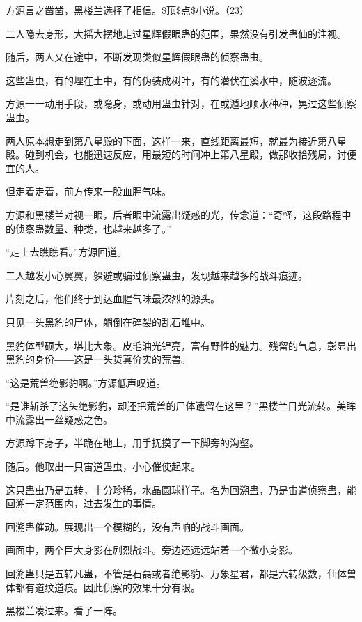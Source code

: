 
\begin{this_body}

方源言之凿凿，黑楼兰选择了相信。\$顶\$点\$小说。（23）

二人隐去身形，大摇大摆地走过星辉假眼蛊的范围，果然没有引发蛊仙的注视。

随后，两人又在途中，不断发现类似星辉假眼蛊的侦察蛊虫。

这些蛊虫，有的埋在土中，有的伪装成树叶，有的潜伏在溪水中，随波逐流。

方源一一动用手段，或隐身，或动用蛊虫针对，在或遁地顺水种种，晃过这些侦察蛊虫。

两人原本想走到第八星殿的下面，这样一来，直线距离最短，就最为接近第八星殿。碰到机会，也能迅速反应，用最短的时间冲上第八星殿，做那收拾残局，讨便宜的人。

但走着走着，前方传来一股血腥气味。

方源和黑楼兰对视一眼，后者眼中流露出疑惑的光，传念道：“奇怪，这段路程中的侦察蛊数量、种类，也越来越多了。”

“走上去瞧瞧看。”方源回道。

二人越发小心翼翼，躲避或骗过侦察蛊虫，发现越来越多的战斗痕迹。

片刻之后，他们终于到达血腥气味最浓烈的源头。

只见一头黑豹的尸体，躺倒在碎裂的乱石堆中。

黑豹体型硕大，堪比大象。皮毛油光锃亮，富有野性的魅力。残留的气息，彰显出黑豹的身份――这是一头货真价实的荒兽。

“这是荒兽绝影豹啊。”方源低声叹道。

“是谁斩杀了这头绝影豹，却还把荒兽的尸体遗留在这里？”黑楼兰目光流转。美眸中流露出一丝疑惑之色。

方源蹲下身子，半跪在地上，用手抚摸了一下脚旁的沟壑。

随后。他取出一只宙道蛊虫，小心催使起来。

这只蛊虫乃是五转，十分珍稀，水晶圆球样子。名为回溯蛊，乃是宙道侦察蛊，能回溯一定范围内，过去发生的事情。

回溯蛊催动。展现出一个模糊的，没有声响的战斗画面。

画面中，两个巨大身影在剧烈战斗。旁边还远远站着一个微小身影。

回溯蛊只是五转凡蛊，不管是石磊或者绝影豹、万象星君，都是六转级数，仙体兽体都有道纹道痕。因此侦察的效果十分有限。

黑楼兰凑过来。看了一阵。


\end{this_body}
